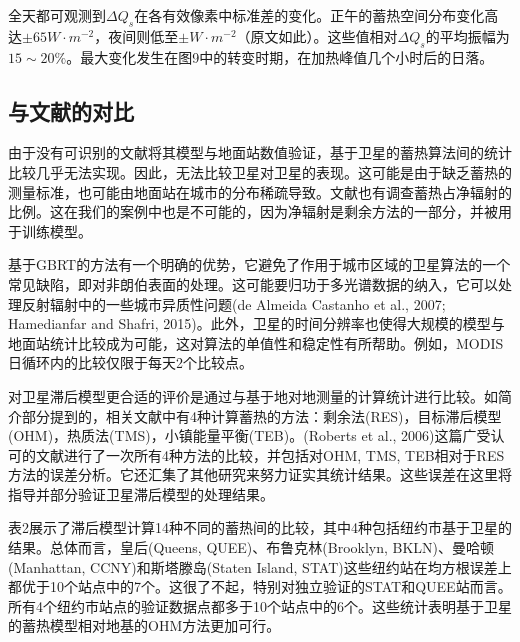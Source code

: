 \documentclass[3p,times]{elsarticle}
\begin{document}
全天都可观测到$\Delta Q_s$在各有效像素中标准差的变化。正午的蓄热空间分布变化高达$\pm65W\cdot m^{-2}$，夜间则低至$\pm W\cdot m^{-2}$（原文如此）。这些值相对$\Delta Q_s$的平均振幅为$15\sim20\%$。最大变化发生在图9中的转变时期，在加热峰值几个小时后的日落。

\subsection{与文献的对比}

由于没有可识别的文献将其模型与地面站数值验证，基于卫星的蓄热算法间的统计比较几乎无法实现。因此，无法比较卫星对卫星的表现。这可能是由于缺乏蓄热的测量标准，也可能由地面站在城市的分布稀疏导致。文献也有调查蓄热占净辐射的比例。这在我们的案例中也是不可能的，因为净辐射是剩余方法的一部分，并被用于训练模型。

基于GBRT的方法有一个明确的优势，它避免了作用于城市区域的卫星算法的一个常见缺陷，即对非朗伯表面的处理。这可能要归功于多光谱数据的纳入，它可以处理反射辐射中的一些城市异质性问题(de Almeida Castanho et al., 2007; Hamedianfar and Shafri, 2015)。此外，卫星的时间分辨率也使得大规模的模型与地面站统计比较成为可能，这对算法的单值性和稳定性有所帮助。例如，MODIS日循环内的比较仅限于每天2个比较点。

对卫星滞后模型更合适的评价是通过与基于地对地测量的计算统计进行比较。如简介部分提到的，相关文献中有4种计算蓄热的方法：剩余法(RES)，目标滞后模型(OHM)，热质法(TMS)，小镇能量平衡(TEB)。(Roberts et al., 2006)这篇广受认可的文献进行了一次所有4种方法的比较，并包括对OHM, TMS, TEB相对于RES方法的误差分析。它还汇集了其他研究来努力证实其统计结果。这些误差在这里将指导并部分验证卫星滞后模型的处理结果。

表2展示了滞后模型计算14种不同的蓄热间的比较，其中4种包括纽约市基于卫星的结果。总体而言，皇后(Queens, QUEE)、布鲁克林(Brooklyn, BKLN)、曼哈顿(Manhattan, CCNY)和斯塔滕岛(Staten Island, STAT)这些纽约站在均方根误差上都优于10个站点中的7个。这很了不起，特别对独立验证的STAT和QUEE站而言。所有4个纽约市站点的验证数据点都多于10个站点中的6个。这些统计表明基于卫星的蓄热模型相对地基的OHM方法更加可行。
\end{document}
